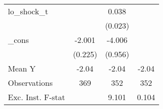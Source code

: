{\begin{tabular}{l*{3}{c}}
\addlinespace
lo\_shock\_t  &                     &       0.038         &                     \\
            &                     &     (0.023)         &                     \\
\addlinespace
\_cons      &      -2.001\sym{***}&      -4.006\sym{***}&                     \\
            &     (0.225)         &     (0.956)         &                     \\
\midrule
Mean Y      &       -2.04         &       -2.04         &       -2.04         \\
Observations&         369         &         352         &         352         \\
Exc. Inst. F-stat&                     &       9.101         &       0.104         \\
\bottomrule
\end{tabular}
}
